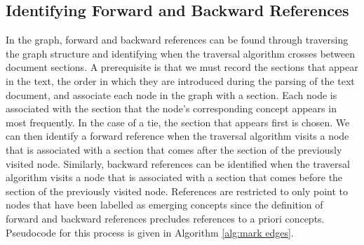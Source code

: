 \documentclass[12pt]{article}
\theoremstyle{grammarstyle}
\begin{document}
\subsection{Identifying Forward and Backward References} \label{sec:identifying_references}
In the graph, forward and backward references can be found through traversing the graph structure and identifying when the traversal algorithm crosses between document sections. A prerequisite is that we must record the sections that appear in the text, the order in which they are introduced during the parsing of the text document, and associate each node in the graph with a section. Each node is associated with the section that the node's corresponding concept appears in most frequently. In the case of a tie, the section that appears first is chosen. We can then identify a forward reference when the traversal algorithm visits a node that is associated with a section that comes after the section of the previously visited node. Similarly, backward references can be identified when the traversal algorithm visits a node that is associated with a section that comes before the section of the previously visited node. References are restricted to only point to nodes that have been labelled as emerging concepts since the definition of forward and backward references precludes references to a priori concepts. Pseudocode for this process is given in Algorithm \ref{alg:mark edges}.

\DontPrintSemicolon
\end{document}
